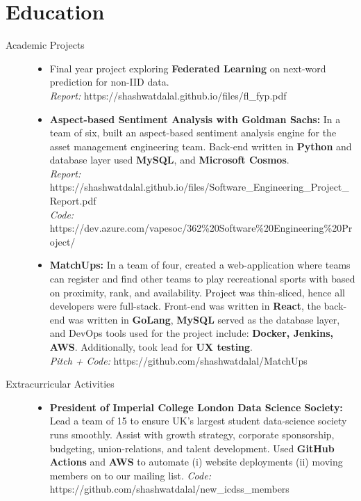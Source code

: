 \documentclass[a4paper]{deedy-resume} %
\begin{document}
\section{Education}
    \begin{description}
        \item[Academic Projects] \hspace{7.5cm}
            \begin{itemize}
                \item Final year project exploring \textbf{Federated Learning} on next-word prediction for non-IID data. \\
                \textit{Report: } https://shashwatdalal.github.io/files/fl\_fyp.pdf 
                \item \textbf{Aspect-based Sentiment Analysis with Goldman Sachs:} In a team of six, built an aspect-based sentiment analysis engine for the asset management engineering team. Back-end written in \textbf{Python} and database layer used \textbf{MySQL}, and \textbf{Microsoft Cosmos}. \\
                \textit{Report:} https://shashwatdalal.github.io/files/Software\_Engineering\_Project\_Report.pdf \\ \textit{Code:} https://dev.azure.com/vapesoc/362\%20Software\%20Engineering\%20Project/
                \item \textbf{MatchUps:} In a team of four, created a web-application where teams can register and find other teams to play recreational sports with based on proximity, rank, and availability. Project was thin-sliced, hence all developers were full-stack. Front-end was written in \textbf{React}, the back-end was written in \textbf{GoLang}, \textbf{MySQL} served as the database layer, and DevOps tools used for the project include: \textbf{Docker, Jenkins, AWS}. Additionally, took lead for \textbf{UX testing}. \\
                \textit{Pitch + Code:} https://github.com/shashwatdalal/MatchUps
        \end{itemize}
         \item[Extracurricular Activities] \hspace{7.5cm}
            \begin{itemize}
                \item \textbf{President of Imperial College London Data Science Society:} Lead a team of 15 to ensure UK's largest student data-science society runs smoothly. Assist with growth strategy, corporate sponsorship, budgeting, union-relations, and talent development. Used \textbf{GitHub Actions} and \textbf{AWS} to automate (i) website deployments (ii) moving members on to our mailing list.
                \textit{Code:} https://github.com/shashwatdalal/new\_icdss\_members
        \end{itemize}
    \end{description}
\end{document}
